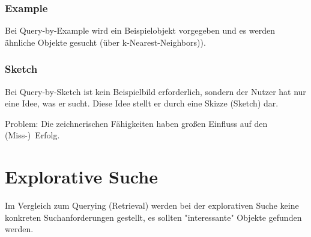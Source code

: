 			\subsubsection{Example}
				Bei Query-by-Example wird ein Beispielobjekt vorgegeben und es werden ähnliche Objekte gesucht (\zB über k-Nearest-Neighbors)).

			\subsubsection{Sketch}
				Bei Query-by-Sketch ist kein Beispielbild erforderlich, sondern der Nutzer hat nur eine Idee, was er sucht. Diese Idee stellt er durch eine Skizze (Sketch) dar.
				
				Problem: Die zeichnerischen Fähigkeiten haben großen Einfluss auf den (Miss-)~Erfolg.

	\section{Explorative Suche}
		Im Vergleich zum Querying (Retrieval) werden bei der explorativen Suche keine konkreten Suchanforderungen gestellt, \dh es sollten "interessante" Objekte gefunden werden.
